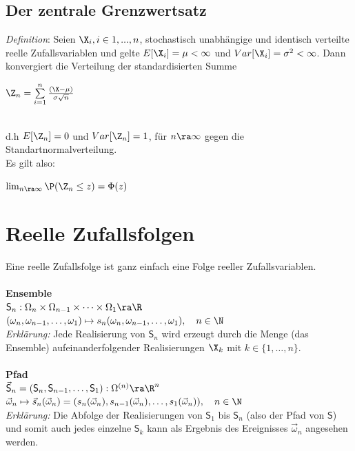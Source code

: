 \documentclass[german,color,6pt]{latex4ei/latex4ei_sheet}
\begin{document}
\begin{sectionbox}
	\subsection{Der zentrale Grenzwertsatz}
	\emph{Definition}: Seien $\X_i, i \in {1,...,n}$, stochastisch unabhängige und identisch
	verteilte reelle Zufallsvariablen und gelte $E[\X_i] = \mu < \infty$ und $Var[\X_i] = \sigma^2 < \infty$. 
	Dann konvergiert die Verteilung der standardisierten Summe\\ 
	\centerline{$\Z_n= \sum\limits_{i=1}^{n}\frac{(\X-\mu)}{\sigma\sqrt{n}}$} \\
	d.h $E[\Z_n] = 0$ und $Var[\Z_n] = 1$, für $n \ra \infty$ gegen die Standartnormalverteilung. \\
	Es gilt also: \\
	\centerline{$\lim_{n \ra \infty} \P({\Z_n \le z}) = \Phi (z)$}
\end{sectionbox}	


\vfill

\section{Reelle Zufallsfolgen}
\begin{sectionbox}
	Eine reelle Zufallsfolge ist ganz einfach eine Folge reeller Zufallsvariablen. \\ \\
	\textbf{Ensemble} \\
	$\textsf{S}_n : \Omega_n \times \Omega_{n-1} \times \dots \times \Omega_1 \ra \R$\\
	$(\omega_n,\omega_{n-1},\dots,\omega_1) \mapsto s_n(\omega_n,\omega_{n-1},\dots,\omega_1), \quad n \in \N$\\
	\emph{Erklärung:} Jede Realisierung von $\textsf{S}_n$ wird erzeugt durch die Menge (das Ensemble) aufeinanderfolgender Realisierungen $\X_k$ mit $k \in \{1,\dots,n\}$. \\ \\	
	\textbf{Pfad} \\
	$\vec{\textsf{S}}_n = (\textsf{S}_n,\textsf{S}_{n-1},\dots,\textsf{S}_1) : \Omega^{(n)} \ra \R^n$\\
	$\vec{\omega}_n \mapsto \vec{s}_n(\vec{\omega}_n) = (s_n(\vec{\omega}_n),s_{n-1}(\vec{\omega}_n),\dots,s_1(\vec{\omega}_n)), \quad n \in \N$\\
	\emph{Erklärung:} Die Abfolge der Realisierungen von $\textsf{S}_1$ bis $\textsf{S}_n$ (also der Pfad von $\textsf{S}$) und somit auch jedes einzelne $\textsf{S}_k$ kann als Ergebnis des Ereignisses $\vec{\omega}_n$ angesehen werden.
\end{sectionbox}
\end{document}
